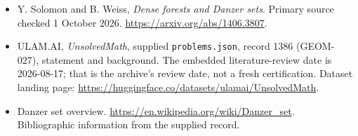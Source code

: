 \documentclass[11pt,a4paper]{article}
\begin{document}
{\small

\begin{itemize}
\item[E1] Y. Solomon and B. Weiss, \emph{Dense forests and Danzer sets}. Primary source checked 1 October 2026. \url{https://arxiv.org/abs/1406.3807}.


\item[\hypertarget{source:1386:1}{S1}] ULAM.AI, \emph{UnsolvedMath}, supplied \texttt{problems.json}, record 1386 (GEOM-027), statement and background. The embedded literature-review date is 2026-08-17; that is the archive’s review date, not a fresh certification. Dataset landing page: \url{https://huggingface.co/datasets/ulamai/UnsolvedMath}.

\item[\hypertarget{source:1386:2}{S2}] Danzer set overview. \url{https://en.wikipedia.org/wiki/Danzer_set}. Bibliographic information from the supplied record.

\end{itemize}

}

\label{end:1386}
\end{document}
